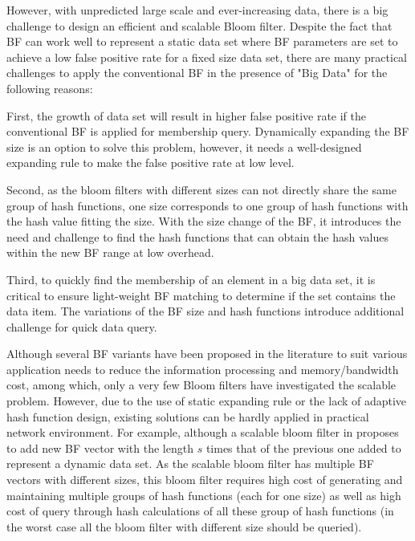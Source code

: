 \documentclass[10pt,journal,compsoc]{IEEEtran}
\newcommand{\rev}[1]{#1}
\begin{document}
However, with unpredicted large scale and ever-increasing data, there is a big challenge to design an efficient and scalable Bloom filter.
Despite the fact that BF can work well to represent a static data set where BF parameters are set to achieve a low false positive rate for a fixed size data set, there are many practical challenges to apply the conventional BF in the presence of "Big Data" for the following reasons:


First, the growth of data set will result in higher false positive rate if the conventional BF is applied for membership query. Dynamically expanding the BF size is an option to solve this problem, however, it needs a well-designed expanding rule to \rev{make} the false positive rate at low level.

Second, \rev{as the bloom filters with different sizes can not directly share the same group of hash functions, one size corresponds to one group of hash functions with the hash value fitting the size.} With the size change of the BF, it introduces the need and challenge to find the hash functions that can obtain the hash values within the new BF range at low overhead.

Third, to quickly find the membership of an element in a big data set, it is critical to ensure light-weight BF matching to determine if the set contains the data item. The variations of the BF size and hash functions introduce additional challenge for quick data query.

Although several BF variants \cite{6848046,fan2000summary,mitzenmacher2002compressed,kumar2006space,deng2006approximately,dutta2012towards,dutta2013streaming,yoon2010aging,tree6848077,guo2006theory, xie2007scalable} have been proposed in the literature to suit
various application needs to reduce the information processing and memory/bandwidth cost,
among which, only a very few Bloom filters \cite{guo2006theory, wei2010mad2,almeida2007scalable,xie2007scalable} have investigated the scalable problem. However, due to the use of static expanding rule or the lack of adaptive hash function design, existing solutions can be hardly  applied in practical network environment. For example, although a scalable bloom filter in  \cite{almeida2007scalable} proposes to add new BF vector with the length $s$ times that of the previous one added to represent a dynamic data set. As the scalable bloom filter \cite{almeida2007scalable} has multiple BF vectors with different sizes,  this bloom filter requires high cost of generating and maintaining multiple groups of hash functions (each for one size) as well as high cost of query through hash calculations of all these group of hash functions (in the worst case all the bloom filter with different size should be queried).
\end{document}
